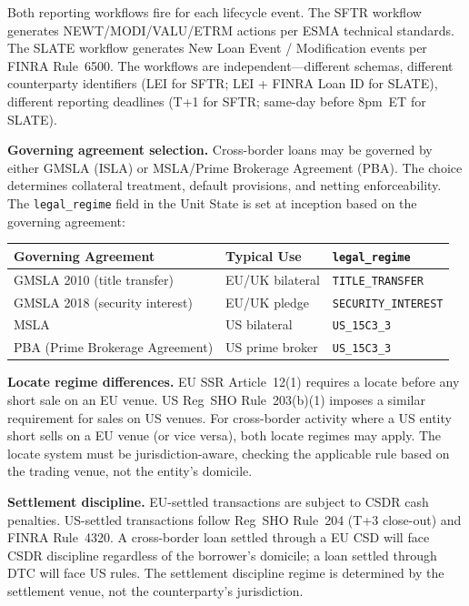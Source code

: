 \documentclass[11pt,a4paper]{article}
\begin{document}
\noindent Both reporting workflows fire for each lifecycle event. The SFTR workflow generates NEWT/MODI/VALU/ETRM actions per ESMA technical standards. The SLATE workflow generates New Loan Event / Modification events per FINRA Rule~6500. The workflows are independent---different schemas, different counterparty identifiers (LEI for SFTR; LEI + FINRA Loan ID for SLATE), different reporting deadlines (T+1 for SFTR; same-day before 8pm~ET for SLATE).

\medskip
\noindent\textbf{Governing agreement selection.} Cross-border loans may be governed by either GMSLA (ISLA) or MSLA/Prime Brokerage Agreement (PBA). The choice determines collateral treatment, default provisions, and netting enforceability. The \texttt{legal\_regime} field in the Unit State is set at inception based on the governing agreement:

\begin{center}\small
\begin{tabular}{l l l}
\toprule
\textbf{Governing Agreement} & \textbf{Typical Use} & \textbf{\texttt{legal\_regime}} \\
\midrule
GMSLA 2010 (title transfer) & EU/UK bilateral & \texttt{TITLE\_TRANSFER} \\
GMSLA 2018 (security interest) & EU/UK pledge & \texttt{SECURITY\_INTEREST} \\
MSLA & US bilateral & \texttt{US\_15C3\_3} \\
PBA (Prime Brokerage Agreement) & US prime broker & \texttt{US\_15C3\_3} \\
\bottomrule
\end{tabular}
\end{center}

\medskip
\noindent\textbf{Locate regime differences.} EU SSR Article~12(1) requires a locate before any short sale on an EU venue. US Reg~SHO Rule~203(b)(1) imposes a similar requirement for sales on US venues. For cross-border activity where a US entity short sells on a EU venue (or vice versa), both locate regimes may apply. The locate system must be jurisdiction-aware, checking the applicable rule based on the trading venue, not the entity's domicile.

\medskip
\noindent\textbf{Settlement discipline.} EU-settled transactions are subject to CSDR cash penalties. US-settled transactions follow Reg~SHO Rule~204 (T+3 close-out) and FINRA Rule~4320. A cross-border loan settled through a EU CSD will face CSDR discipline regardless of the borrower's domicile; a loan settled through DTC will face US rules. The settlement discipline regime is determined by the settlement venue, not the counterparty's jurisdiction.
\end{document}
